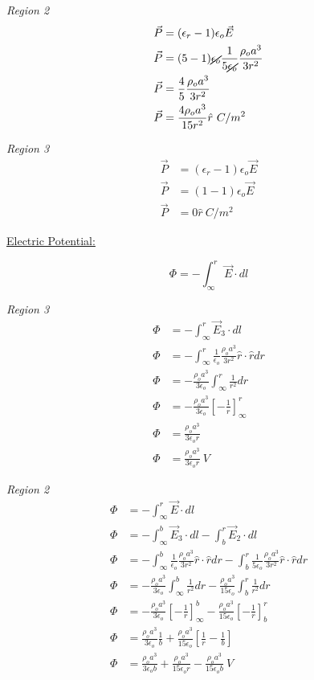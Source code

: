 \documentclass[12pt]{article}
\begin{document}
\textit{Region 2}			
	\begin{align*}
		\vec{P} &= (\epsilon_r - 1)\epsilon_o \vec{E} \\
		\vec{P} &= (5 - 1) \cancel{\epsilon_o} \frac{1}{5 \cancel{\epsilon_o}} \frac{\rho_o a^3}{3 r^2} \\
		\vec{P} &= \frac{4}{5} \frac{\rho_o a^3}{3 r^2}\\
		\vec{P} &= \frac{4\rho_o a^3}{15 r^2} \hat{r}~C/m^2
	\end{align*}
	
\textit{Region 3}			
	\begin{align*}
		\vec{P} &= (\epsilon_r - 1)\epsilon_o \vec{E} \\
		\vec{P} &= (1 - 1) \epsilon_o \vec{E} \\
		\vec{P} &= 0 \hat{r}~C/m^2
	\end{align*}
		
\underline{Electric Potential:}

	$$\Phi = -\int_{\infty}^{r} \vec{E} \cdot dl$$
	
	
\textit{Region 3}			
	\begin{align*}
		\Phi &= -\int_{\infty}^{r} \vec{E}_3 \cdot dl \\
		\Phi &= -\int_{\infty}^{r} \frac{1}{\epsilon_o} \frac{\rho_o a^3}{3 r^2} \hat{r} \cdot \hat{r} dr \\
		\Phi &= -\frac{\rho_o a^3}{3 \epsilon_o} \int_{\infty}^{r} \frac{1}{r^2} dr \\
		\Phi &= -\frac{\rho_o a^3}{3 \epsilon_o} \left[-\frac{1}{r}\right]_\infty^r \\
		\Phi &= \frac{\rho_o a^3}{3\epsilon_o r} \\
		\Phi &= \frac{\rho_o a^3}{3\epsilon_o r}~V
	\end{align*}
		
\textit{Region 2}
	\begin{align*}
		\Phi &= -\int_{\infty}^{r} \vec{E} \cdot dl \\
		\Phi &= -\int_{\infty}^{b} \vec{E}_3 \cdot dl - \int_b^r \vec{E}_2 \cdot dl\\
		\Phi &= -\int_{\infty}^{b} \frac{1}{\epsilon_o} \frac{\rho_o a^3}{3 r^2} \hat{r} \cdot \hat{r} dr - \int_b^r \frac{1}{5 \epsilon_o} \frac{\rho_o a^3}{3 r^2} \hat{r} \cdot \hat{r} dr\\
		\Phi &= -\frac{\rho_o a^3}{3 \epsilon_o} \int_{\infty}^{b} \frac{1}{r^2} dr - \frac{\rho_o a^3}{15 \epsilon_o} \int_b^r \frac{1}{r^2} dr\\
		\Phi &= -\frac{\rho_o a^3}{3 \epsilon_o} \left[-\frac{1}{r}\right]_\infty^b - \frac{\rho_o a^3}{15 \epsilon_o} \left[-\frac{1}{r}\right]_b^r\\
		\Phi &= \frac{\rho_o a^3}{3 \epsilon_o} \frac{1}{b} + \frac{\rho_o a^3}{15 \epsilon_o} \left[\frac{1}{r} - \frac{1}{b}\right]\\
		\Phi &= \frac{\rho_o a^3}{3 \epsilon_o b} + \frac{\rho_o a^3}{15 \epsilon_o r} - \frac{\rho_o a^3}{15 \epsilon_o b}~V
	\end{align*}
\end{document}

